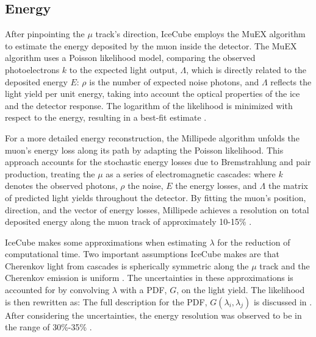 \subsection{Energy}

After pinpointing the $\mu$ track's direction, IceCube employs the MuEX algorithm to estimate the energy deposited by the muon inside the detector.
The MuEX algorithm uses a Poisson likelihood model, comparing the observed photoelectrons $k$ to the expected light output, $\Lambda$, which is directly related to the deposited energy $E$:
\muEXLLH
$\rho$ is the number of expected noise photons, and $\Lambda$ reflects the light yield per unit energy, taking into account the optical properties of the ice and the detector response.
The logarithm of the likelihood is minimized with respect to the energy, resulting in a best-fit estimate \cite{IC3_energyReco}.

For a more detailed energy reconstruction, the Millipede algorithm unfolds the muon's energy loss along its path by adapting the Poisson likelihood.
This approach accounts for the stochastic energy losses due to Bremstrahlung and pair production, treating the $\mu$ as a series of electromagnetic cascades:
\vecMULLH
where $k$ denotes the observed photons, $\rho$ the noise, $E$ the energy losses, and \textbf{$\Lambda$} the matrix of predicted light yields throughout the detector.
By fitting the muon's position, direction, and the vector of energy losses, Millipede achieves a resolution on total deposited energy along the muon track of approximately 10-15\% \cite{IC3_energyReco}.

IceCube makes some approximations when estimating $\lambda$ for the reduction of computational time.
Two important assumptions IceCube makes are that Cherenkov light from cascades is spherically symmetric along the $\mu$ track and the Cherenkov emission is uniform \cite{IC3_energyReco}.
The uncertainties in these approximations is accounted for by convolving $\lambda$ with a PDF, $G$, on the light yield.
The likelihood is then rewritten as:
\LLHwithspice
The full description for the PDF, $G(\lambda_i, \lambda_j)$ is discussed in \cite{IC3_energyReco}.
After considering the uncertainties, the energy resolution was observed to be in the range of 30\%-35\% \cite{IC3_energyReco}.

